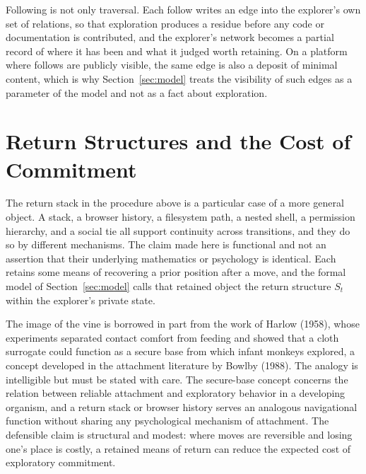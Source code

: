 \documentclass[11pt]{article}
\theoremstyle{definition}
\theoremstyle{remark}
\begin{document}
Following is not only traversal. Each follow writes an edge into the explorer's own set of relations, so that exploration produces a residue before any code or documentation is contributed, and the explorer's network becomes a partial record of where it has been and what it judged worth retaining. On a platform where follows are publicly visible, the same edge is also a deposit of minimal content, which is why Section~\ref{sec:model} treats the visibility of such edges as a parameter of the model and not as a fact about exploration.

\section{Return Structures and the Cost of Commitment}\label{sec:return}

The return stack in the procedure above is a particular case of a more general object. A stack, a browser history, a filesystem path, a nested shell, a permission hierarchy, and a social tie all support continuity across transitions, and they do so by different mechanisms. The claim made here is functional and not an assertion that their underlying mathematics or psychology is identical. Each retains some means of recovering a prior position after a move, and the formal model of Section~\ref{sec:model} calls that retained object the return structure $S_t$ within the explorer's private state.

The image of the vine is borrowed in part from the work of Harlow (1958), whose experiments separated contact comfort from feeding and showed that a cloth surrogate could function as a secure base from which infant monkeys explored, a concept developed in the attachment literature by Bowlby (1988). The analogy is intelligible but must be stated with care. The secure-base concept concerns the relation between reliable attachment and exploratory behavior in a developing organism, and a return stack or browser history serves an analogous navigational function without sharing any psychological mechanism of attachment. The defensible claim is structural and modest: where moves are reversible and losing one's place is costly, a retained means of return can reduce the expected cost of exploratory commitment.
\end{document}
